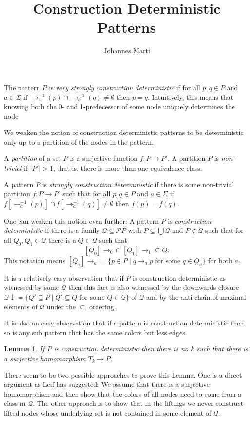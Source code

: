\documentclass[a4paper]{article}
\title{Construction Deterministic Patterns}
\author{Johannes Marti}
\newcommand{\prearrow}[1]{{\rightarrow_{#1}^{-1}}}
\newcommand{\powerset}{\mathcal{P}}
\newcommand{\Q}{\mathcal{Q}}
\newtheorem{lemma}[theorem]{Lemma}
\begin{document}
\maketitle

\noindent The pattern $P$ is \emph{very strongly construction
deterministic} if for all $p,q \in P$ and $a \in \Sigma$ if
$\prearrow{a}(p) \cap \prearrow{a}(q) \neq \emptyset$ then $p = q$.
Intuitively, this means that knowing both the 0- and 1-predecessor of
some node uniquely determines the node.

We weaken the notion of construction deterministic patterns to be
deterministic only up to a partition of the nodes in the pattern.

A \emph{partition} of a set $P$ is a surjective function $f : P \to P'$.
A partition $P$ is \emph{non-trivial} if $|P'| > 1$, that is, there is
more than one equivalence class.

A pattern $P$ is \emph{strongly construction deterministic} if there is
some non-trivial partition $f : P \to P'$ such that for all $p,q \in P$
and $a \in \Sigma$ if $f[\prearrow{a}(p)] \cap f[\prearrow{a}(q)] \neq
\emptyset$ then $f(p) = f(q)$.

One can weaken this notion even further: A pattern $P$ is
\emph{construction deterministic} if there is a family $\Q \subseteq
\powerset P$ with $P \subseteq \bigcup \Q$ and $P \notin \Q$ such that
for all $Q_0, Q_1 \in \Q$ there is a $Q \in \Q$ such that
\[
 [Q_0]{\rightarrow_0} \cap [Q_1]{\rightarrow_1} \subseteq Q.
\]
This notation means $[Q_a]{\rightarrow_a} = \{p \in P \mid q \rightarrow_a
p \mbox{ for some } q \in Q_a\}$ for both $a$.

It is a relatively easy observation that if $P$ is construction
deterministic as witnessed by some $\Q$ then this fact is also witnessed
by the downwards closure ${\Q\!\downarrow} = \{Q' \subseteq P \mid Q'
\subseteq Q \mbox{ for some } Q \in \Q\}$ of $\Q$ and by the anti-chain
of maximal elements of $\Q$ under the $\subseteq$ ordering.

It is also an easy observation that if a pattern is construction
deterministic then so is any sub pattern that has the same colors but
less edges.

\begin{lemma} \label{killer lemma}
 If $P$ is construction deterministic then there is no $k$ such
that there is a surjective homomorphism $T_k \to P$.
\end{lemma}
There seem to be two possible approaches to prove this Lemma. One is a
direct argument as Leif has suggested: We assume that there is a
surjective homomorphism and then show that the colors of all nodes need
to come from a class in $\Q$. The other approach is to show that in the
liftings we never construct lifted nodes whose underlying set is not
contained in some element of $\Q$.
\end{document}
